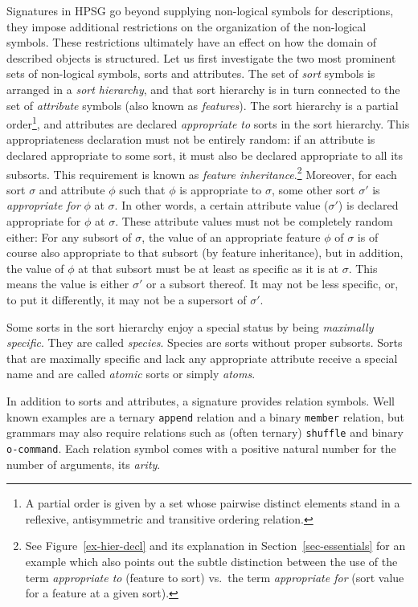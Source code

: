 \documentclass[output=paper
                ,modfonts
                ,nonflat
	        ,collection
	        ,collectionchapter
	        ,collectiontoclongg
 	        ,biblatex
                ,babelshorthands
                ,newtxmath
                ,draftmode
                ,colorlinks, citecolor=brown
]{./langsci/langscibook}
\begin{document}
{{Signatures in HPSG go beyond supplying non-logical symbols for
descriptions, they impose additional restrictions on the
organization of the non-logical symbols. These restrictions ultimately have an effect on
how the domain of described objects is structured. Let us first
investigate the two most prominent sets of non-logical symbols, sorts
and attributes. The set of \emph{sort} symbols is arranged in a
\emph{sort hierarchy}, and that sort hierarchy is in turn connected to
the set of \emph{attribute} symbols (also known as
\emph{features}). The sort hierarchy is a partial order\footnote{A partial order is given by a set whose pairwise distinct elements stand in a reflexive,
antisymmetric and transitive ordering relation.}, and
attributes are declared \emph{appropriate to} sorts
in the sort hierarchy. This appropriateness declaration must not be
entirely random: if an attribute is declared appropriate to some sort,
it must also be declared appropriate to all its subsorts. This requirement
is known as \emph{feature inheritance}.\footnote{See Figure~\ref{ex-hier-decl} and its explanation in Section~\ref{sec-essentials} for an example which also points out the subtle distinction between the use of the term \emph{appropriate to} (feature to sort) vs.\ the term \emph{appropriate for} (sort value for a feature at a given sort).}  Moreover, for each
sort $\sigma$ and attribute $\phi$ such that $\phi$ is appropriate to
$\sigma$, some other sort $\sigma'$ is \emph{appropriate for} $\phi$
at $\sigma$. In other words, a certain attribute value ($\sigma'$) is declared
appropriate for $\phi$ at $\sigma$. These attribute values must not be
completely random either: For any subsort of $\sigma$, the value of an
appropriate feature $\phi$ of $\sigma$ is of course also appropriate
to that subsort (by feature inheritance), but in addition, the value of $\phi$ at that subsort
must be at least as specific as it is at $\sigma$. This means the value is either
$\sigma'$ or a subsort thereof. It may not be less specific, or, to put
it differently, it may not be a
supersort of $\sigma'$.

Some sorts in the sort hierarchy enjoy a special status by being
\emph{maximally specific}. They are called \emph{species}. Species
are sorts without proper subsorts.
Sorts that are maximally specific and lack any appropriate attribute receive
a special name and are called \emph{atomic} sorts or simply \emph{atoms}.

In addition to sorts and attributes, a signature provides relation
symbols.  Well known examples are a ternary \texttt{append} relation
and a binary \texttt{member} relation, but grammars may also require
relations such as (often ternary) \texttt{shuffle} and binary
\texttt{o-command}. Each relation symbol comes with
a positive natural number for the number of arguments, its \emph{arity}.

}}
\end{document}
